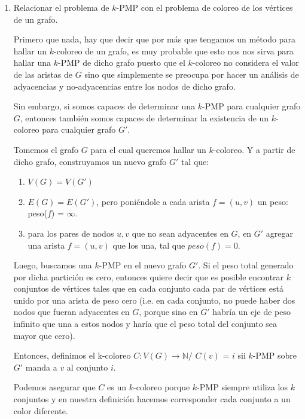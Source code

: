 \documentclass[11pt, a4paper, twoside]{article}
\begin{document}
\begin{enumerate}
			\item Relacionar el problema de $k$-PMP con el problema de coloreo de los vértices
				  de un grafo.
				  
				  Primero que nada, hay que decir que por más que tengamos un método para hallar
				  un $k$-coloreo de un grafo, es muy probable que esto nos nos sirva para hallar una
				  $k$-PMP de dicho grafo puesto que el $k$-coloreo no considera el valor de las 
				  aristas de $G$ sino que simplemente se preocupa por hacer un análisis de 
				  adyacencias y no-adyacencias entre los nodos de dicho grafo.
				  
				  Sin embargo, si somos capaces de determinar una $k$-PMP para cualquier grafo $G$, entonces también
				  somos capaces de determinar la existencia de un $k$-coloreo para cualquier
				  grafo $G'$.
				  
				  Tomemos el grafo $G$ para el cual queremos hallar un $k$-coloreo. Y a partir de dicho grafo, construyamos
				  un nuevo grafo $G'$ tal que: 
				  \begin{enumerate}
					\item $V(G) = V(G')$ 
					\item $E(G) = E(G')$, pero poniéndole a cada arista $f=(u,v)$ un peso: peso($f$) = $\infty$.
					\item para los pares de nodos $u,v$ que no sean adyacentes en $G$, en $G'$ agregar
						  una arista $f=(u,v)$ que los una, tal que $peso(f) = 0$. 
				  \end{enumerate}
				  Luego, buscamos una $k$-PMP en el nuevo grafo $G'$. Si el peso total generado por dicha 
				  partición es cero, entonces quiere decir que es posible encontrar $k$ 
				  conjuntos de vértices tales que en cada conjunto cada par de vértices está unido por una arista
				  de peso cero (i.e. en cada conjunto, no puede haber
				  dos nodos que fueran adyacentes en $G$, porque sino en $G'$ habría un eje de peso infinito
				  que una a estos nodos y haría que el peso total del conjunto sea mayor que cero). 
				  
				  Entonces, definimos el k-coloreo $C: V(G) \rightarrow \mathbb{N} / $ $C(v)$ = $i$ sii $k$-PMP sobre $G'$ 
				  manda a $v$ al conjunto $i$.
				  
				  Podemos asegurar que $C$ es un $k$-coloreo porque $k$-PMP siempre utiliza los $k$ conjuntos y en nuestra definición
				  hacemos corresponder cada conjunto a un color diferente.
				  

\end{enumerate}
\end{document}
